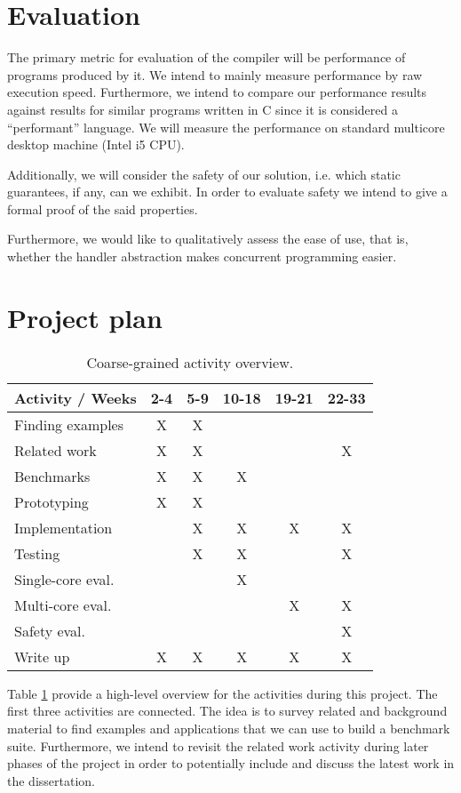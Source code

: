 \documentclass[preprint,10pt,numbers]{sigplanconf}
\begin{document}
  \section{Evaluation}
  The primary metric for evaluation of the compiler will be performance of programs produced by it. We intend to mainly measure performance by raw execution speed. Furthermore, we intend to compare our performance results against results for similar programs written in C since it is considered a ``performant'' language. We will measure the performance on standard multicore desktop machine (Intel i5 CPU).

Additionally, we will consider the safety of our solution, i.e. which static guarantees, if any, can we exhibit. In order to evaluate safety we intend to give a formal proof of the said properties.

Furthermore, we would like to qualitatively assess the ease of use, that is, whether the handler abstraction makes concurrent programming easier.

  \section{Project plan}
  \begin{table}[H]
    \centering
    \begin{tabular}{ | l | c | c | c | c | c | }
      \hline
      \multicolumn{1}{|c|}{Activity / Weeks} & 2-4 & 5-9 & 10-18 & 19-21 & 22-33 \\
      \hline
      Finding examples & X & X & & & \\
      \hline      
      Related work   & X  & X &  &   & X \\
      \hline
      Benchmarks     & X & X & X & & \\
      \hline
      Prototyping    & X & X & & & \\
      \hline
      Implementation &  & X & X & X  & X \\
      \hline
      Testing        &  & X & X &  & X \\
      \hline
    Single-core eval. &   &  & X &  &  \\
      \hline
    Multi-core eval. &   &  &    & X  & X \\
      \hline
      Safety eval. &   &   &  &  & X \\
      \hline
      Write up       & X & X & X & X  & X  \\
      \hline
    \end{tabular}\caption{Coarse-grained activity overview.}\label{tbl:activities}
  \end{table}
Table \ref{tbl:activities} provide a high-level overview for the activities during this project. The first three activities are connected. The idea is to survey related and background material to find examples and applications that we can use to build a benchmark suite. Furthermore, we intend to revisit the related work activity during later phases of the project in order to potentially include and discuss the latest work in the dissertation.
\end{document}
